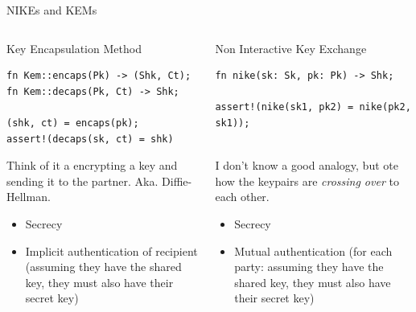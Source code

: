 \begin{frame}[fragile,t]{NIKEs and KEMs}
\hypertarget{nike-kem-2}{}
  \vspace{-1.5em}
  \begin{columns}[t]
    \begin{column}{.5\linewidth}
      \begin{block}{Key Encapsulation Method}

        \small
        \begin{verbatim}
fn Kem::encaps(Pk) -> (Shk, Ct);
fn Kem::decaps(Pk, Ct) -> Shk;

(shk, ct) = encaps(pk);
assert!(decaps(sk, ct) = shk)
        \end{verbatim}  
        \vspace{1em}
        Think of it a encrypting a key and sending it
        to the partner. Aka. Diffie-Hellman.

        \vspace{0.7em}
        \begin{itemize}
          \item Secrecy
          \item Implicit authentication of recipient
            (assuming they have the shared key, they must
            also have their secret key)
        \end{itemize}
      \end{block}
    \end{column}

    \begin{column}{.5\linewidth}
      \begin{block}{Non Interactive Key Exchange}
        \small
        \begin{verbatim}
fn nike(sk: Sk, pk: Pk) -> Shk;

assert!(nike(sk1, pk2) = nike(pk2, sk1));


        \end{verbatim}  

        \vspace{1em}
        I don't know a good analogy, but ote how the
        keypairs are \emph{crossing over} to each other.

        \vspace{0.7em}
        \begin{itemize}
          \item Secrecy
          \item Mutual authentication
            (for each party: assuming they have the shared key, they must
            also have their secret key)
        \end{itemize}
      \end{block}
    \end{column}

  \end{columns}
\end{frame}


